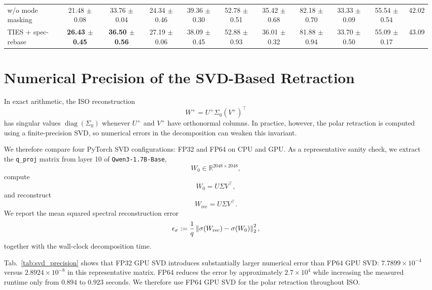 \documentclass[11pt, a4paper]{utda}
\theoremstyle{plain}
\theoremstyle{definition}
\theoremstyle{remark}
\begin{document}
\begin{table}[ht]
{\begin{tabular}{l*{10}{c}}
w/o mode masking
& 21.48 $\pm$ 0.08 & 33.76 $\pm$ 0.04
& 24.34 $\pm$ 0.46 & 39.36 $\pm$ 0.30
& 52.78 $\pm$ 0.51 & 35.42 $\pm$ 0.68
& 82.18 $\pm$ 0.70 & 33.33 $\pm$ 0.09
& 55.54 $\pm$ 0.54 & 42.02 \\

TIES + spec-rebase
& \textbf{26.43 $\pm$ 0.45} & \textbf{36.50 $\pm$ 0.56}
& 27.19 $\pm$ 0.06 & 38.09 $\pm$ 0.45
& 52.88 $\pm$ 0.93 & 36.01 $\pm$ 0.32
& 81.88 $\pm$ 0.94 & 33.70 $\pm$ 0.50
& 55.09 $\pm$ 0.17 & 43.09 \\\bottomrule
\end{tabular}%
}
\endgroup
\end{table}


\section{Numerical Precision of the SVD-Based Retraction}
\label{sec:svd_precision_issue}

In exact arithmetic, the ISO reconstruction
\[
    W^+
    =
    U^+\Sigma_0(V^+)^\top
\]
has singular values $\operatorname{diag}(\Sigma_0)$ whenever
$U^+$ and $V^+$ have orthonormal columns. In practice, however, the polar
retraction is computed using a finite-precision SVD, so numerical errors in
the decomposition can weaken this invariant.

We therefore compare four PyTorch SVD configurations:
FP32 and FP64 on CPU and GPU. As a representative sanity check, we extract the
\texttt{q\_proj} matrix from layer 10 of
\texttt{Qwen3-1.7B-Base},
\[
    W_0\in\mathbb R^{2048\times2048},
\]
compute
\[
    W_0=U\Sigma V^\top,
\]
and reconstruct
\[
    W_{\mathrm{rec}}=U\Sigma V^\top.
\]
We report the mean squared spectral reconstruction error
\begin{equation}
\label{eq:svd_spectral_error}
\small
    \epsilon_{\sigma}
    :=
    \frac{1}{q}
    \left\|
        \sigma(W_{\mathrm{rec}})
        -
        \sigma(W_0)
    \right\|_2^2,
\end{equation}
together with the wall-clock decomposition time.

Tab.~\ref{tab:svd_precision} shows that FP32 GPU SVD introduces substantially
larger numerical error than FP64 GPU SVD:
$7.7899\times10^{-4}$ versus
$2.8924\times10^{-8}$ in this representative matrix.
FP64 reduces the error by approximately
$2.7\times10^4$ while increasing the measured runtime only from
$0.894$ to $0.923$ seconds.
We therefore use FP64 GPU SVD for the polar retraction throughout ISO.
\end{document}
